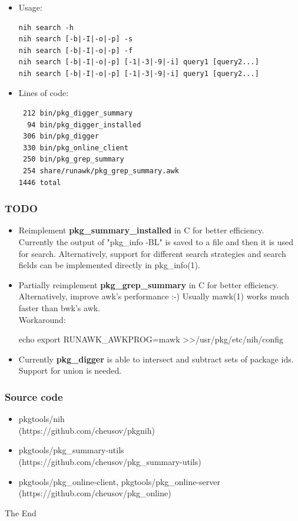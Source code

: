 \documentclass[hyperref=unicode,ascii,xcolor=dvipsnames]{beamer}
\begin{document}
\begin{frame}[fragile]
  \frametitle{}
  \begin{itemize}
  \item Usage:
\begin{verbatim}
nih search -h
nih search [-b|-I|-o|-p] -s
nih search [-b|-I|-o|-p] -f
nih search [-b|-I|-o|-p] [-1|-3|-9|-i] query1 [query2...]
nih search [-b|-I|-o|-p] [-1|-3|-9|-i] query1 [query2...]
\end{verbatim}
\item Lines of code:
\begin{verbatim}
 212 bin/pkg_digger_summary
  94 bin/pkg_digger_installed
 306 bin/pkg_digger
 330 bin/pkg_online_client
 250 bin/pkg_grep_summary
 254 share/runawk/pkg_grep_summary.awk
1446 total
\end{verbatim}
  \end{itemize}
\end{frame}

\begin{frame}[fragile]
  \frametitle{TODO}
  \begin{itemize}
  \item Reimplement {\bf pkg\_summary\_installed} in C for better efficiency.
Currently the output of "pkg\_info -BL" is saved to a file and then it is used for search.
Alternatively, support for different search strategies and search fields
can be implemented directly in pkg\_info(1).
  \item Partially reimplement {\bf pkg\_grep\_summary} in C for better efficiency.
Alternatively, improve awk's performance :-) Usually mawk(1) works much faster
than bwk's awk.\\
{\footnotesize Workaround:}\\
\begin{CodeNoLabelSmallest}
echo export RUNAWK\_AWKPROG=mawk \textgreater\textgreater /usr/pkg/etc/nih/config
\end{CodeNoLabelSmallest}
  \item Currently {\bf pkg\_digger} is able to intersect and subtract sets of package ids.
    Support for union is needed.
  \end{itemize}
\end{frame}

\begin{frame}[fragile]
  \frametitle{Source code}
  \begin{itemize}
  \item pkgtools/nih\\
    (https://github.com/cheusov/pkgnih)
  \item pkgtools/pkg\_summary-utils\\
    (https://github.com/cheusov/pkg\_summary-utils)
  \item pkgtools/pkg\_online-client, pkgtools/pkg\_online-server\\
    (https://github.com/cheusov/pkg\_online)
  \end{itemize}
  \begin{center}
    \Huge{The End}
  \end{center}
\end{frame}

\end{document}
